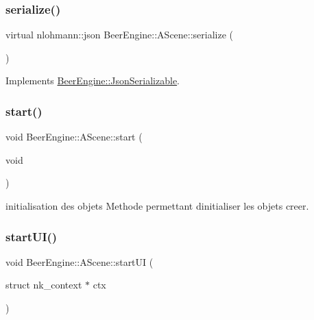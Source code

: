 \mbox{\label{class_beer_engine_1_1_a_scene_ae876ec81592c80e7346f05c56bdaa929}} 
\subsubsection{\texorpdfstring{serialize()}{serialize()}}
{\footnotesize\ttfamily virtual nlohmann\+::json Beer\+Engine\+::\+A\+Scene\+::serialize (\begin{DoxyParamCaption}{ }\end{DoxyParamCaption})\hspace{0.3cm}{\ttfamily [virtual]}}



Implements \mbox{\hyperlink{class_beer_engine_1_1_json_serializable_a17689cbd8fe282c570bd026cc1be5b3b}{Beer\+Engine\+::\+Json\+Serializable}}.

\mbox{\label{class_beer_engine_1_1_a_scene_a332808581c9141259a6acdc2fa8e0e5c}} 
\subsubsection{\texorpdfstring{start()}{start()}}
{\footnotesize\ttfamily void Beer\+Engine\+::\+A\+Scene\+::start (\begin{DoxyParamCaption}\item[{void}]{ }\end{DoxyParamCaption})}



initialisation des objets Methode permettant d\textquotesingle{}initialiser les objets creer. 

\mbox{\label{class_beer_engine_1_1_a_scene_a444a7a1321f9c8c14a2d3821f649c85e}} 
\subsubsection{\texorpdfstring{start\+U\+I()}{startUI()}}
{\footnotesize\ttfamily void Beer\+Engine\+::\+A\+Scene\+::start\+UI (\begin{DoxyParamCaption}\item[{struct nk\+\_\+context $\ast$}]{ctx }\end{DoxyParamCaption})}

